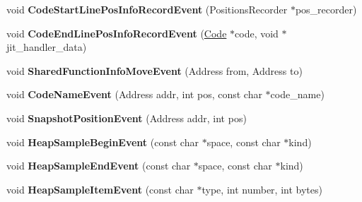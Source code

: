 \begin{DoxyCompactItemize}
\item 
\hypertarget{classv8_1_1internal_1_1_logger_ab545536446713c559e666a814c637c76}{}void {\bfseries Code\+Start\+Line\+Pos\+Info\+Record\+Event} (Positions\+Recorder $\ast$pos\+\_\+recorder)\label{classv8_1_1internal_1_1_logger_ab545536446713c559e666a814c637c76}

\item 
\hypertarget{classv8_1_1internal_1_1_logger_a0dfb2194ed1a70720c12ebe2aa8faea5}{}void {\bfseries Code\+End\+Line\+Pos\+Info\+Record\+Event} (\hyperlink{classv8_1_1internal_1_1_code}{Code} $\ast$code, void $\ast$jit\+\_\+handler\+\_\+data)\label{classv8_1_1internal_1_1_logger_a0dfb2194ed1a70720c12ebe2aa8faea5}

\item 
\hypertarget{classv8_1_1internal_1_1_logger_a553a061808106090e143385055763096}{}void {\bfseries Shared\+Function\+Info\+Move\+Event} (Address from, Address to)\label{classv8_1_1internal_1_1_logger_a553a061808106090e143385055763096}

\item 
\hypertarget{classv8_1_1internal_1_1_logger_a25ef7751705623af5cb5aedfa447efb1}{}void {\bfseries Code\+Name\+Event} (Address addr, int pos, const char $\ast$code\+\_\+name)\label{classv8_1_1internal_1_1_logger_a25ef7751705623af5cb5aedfa447efb1}

\item 
\hypertarget{classv8_1_1internal_1_1_logger_aaee3a369ff53767614fbba0111a3644f}{}void {\bfseries Snapshot\+Position\+Event} (Address addr, int pos)\label{classv8_1_1internal_1_1_logger_aaee3a369ff53767614fbba0111a3644f}

\item 
\hypertarget{classv8_1_1internal_1_1_logger_af234de8800ae099ac496877d3383166a}{}void {\bfseries Heap\+Sample\+Begin\+Event} (const char $\ast$space, const char $\ast$kind)\label{classv8_1_1internal_1_1_logger_af234de8800ae099ac496877d3383166a}

\item 
\hypertarget{classv8_1_1internal_1_1_logger_ac5d04cbc5bda7d5ab0d3cc5533693fd0}{}void {\bfseries Heap\+Sample\+End\+Event} (const char $\ast$space, const char $\ast$kind)\label{classv8_1_1internal_1_1_logger_ac5d04cbc5bda7d5ab0d3cc5533693fd0}

\item 
\hypertarget{classv8_1_1internal_1_1_logger_a22aac49c20fbf307ae82612c6df36617}{}void {\bfseries Heap\+Sample\+Item\+Event} (const char $\ast$type, int number, int bytes)\label{classv8_1_1internal_1_1_logger_a22aac49c20fbf307ae82612c6df36617}


\end{DoxyCompactItemize}
